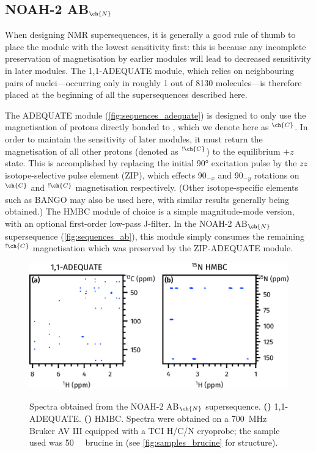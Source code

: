 \documentclass[a4paper,12pt]{article}
\newcommand{\carbon}{\ch{^{13}C}}
\newcommand{\nitrogen}{\ch{^{15}N}}
\newcommand{\magn}[1]{\ch{^1H}$^{#1}$}
\newcommand{\magnnot}[1]{\ch{^1H}$^{!#1}$}
\newcommand*{\brucine}{Spectra were obtained on a \SI{700}{\MHz} Bruker AV III equipped with a TCI H/C/N cryoprobe; the sample used was \SI{50}{\milli\molar} brucine in \ch{CDCl3}}
\newcommand{\angang}[2]{#1\rlap{\unit{\degree}}\ensuremath{_{#2}}}
\newcommand{\abn}{NOAH-2 AB$_{\ch{N}}$}
\begin{document}
\begin{refsection}
\section{NOAH-2 AB\texorpdfstring{$_{\ch{N}}$}{n}}

When designing NMR supersequences, it is generally a good rule of thumb to place the module with the lowest sensitivity first: this is because any incomplete preservation of magnetisation by earlier modules will lead to decreased sensitivity in later modules.
The 1,1-ADEQUATE module, which relies on neighbouring pairs of \carbon{} nuclei---occurring only in roughly 1 out of 8130 molecules---is therefore placed at the beginning of all the supersequences described here.

The ADEQUATE module (\cref{fig:sequences_adequate}) is designed to only use the magnetisation of protons directly bonded to \carbon{}, which we denote here as \magn{\ch{C}}.\autocite{Orts2018M,Yong2021JMR}
In order to maintain the sensitivity of later modules, it must return the magnetisation of all other protons (denoted as \magnnot{\ch{C}}) to the equilibrium $+z$ state.
This is accomplished by replacing the initial \ang{90} excitation pulse by the $zz$ isotope-selective pulse element (ZIP)\autocite{Hansen2021AC,Yong2021JMR}, which effects \angang{90}{-x} and \angang{90}{-y} rotations on \magn{\ch{C}} and \magnnot{\ch{C}} magnetisation respectively.
(Other isotope-specific elements such as BANGO\autocite{Sorensen1994BMR,Nagy2019CC,Nagy2021ACIE} may also be used here, with similar results generally being obtained.\autocite{Yong2021JMR})
The \nitrogen{} HMBC module of choice is a simple magnitude-mode version, with an optional first-order low-pass J-filter.
In the \abn{} supersequence (\cref{fig:sequences_ab}), this module simply consumes the remaining \magnnot{\ch{C}} magnetisation which was preserved by the ZIP-ADEQUATE module.

\begin{figure}[ht]
    \centering
    \includegraphics[]{ab.png}%
    {\label{fig:ab_adeq}}
    {\label{fig:ab_n_hmbc}}
    \caption{
        Spectra obtained from the \abn{} supersequence.
        \textbf{()} 1,1-ADEQUATE.
        \textbf{()} \nitrogen{} HMBC.
        \brucine{} (see \cref{fig:samples_brucine} for structure).
    }
    \label{fig:ab}
\end{figure}



\end{refsection}
\end{document}
